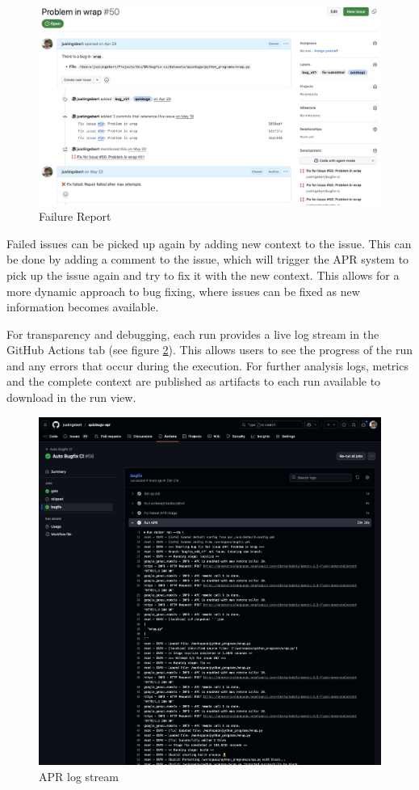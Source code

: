 \begin{figure}[H]
    \centering
    \includegraphics[width=1\textwidth]{images/workflow/issue comment.png}
    \caption{Failure Report}
    \label{fig:failure-report}
\end{figure}

Failed issues can be picked up again by adding new context to the issue. This can be done by adding a comment to the issue, which will trigger the APR system to pick up the issue again and try to fix it with the new context. This allows for a more dynamic approach to bug fixing, where issues can be fixed as new information becomes available.


For transparency and debugging, each run provides a live log stream in the GitHub Actions tab (see figure \ref{fig:log-stream}). This allows users to see the progress of the run and any errors that occur during the execution. For further analysis logs, metrics and the complete context are published as artifacts to each run available to download in the run view.
\begin{figure}[H]
    \centering
    \includegraphics[width=1\textwidth]{images/workflow/logs.png}
    \caption{APR log stream}
    \label{fig:log-stream}
\end{figure}


